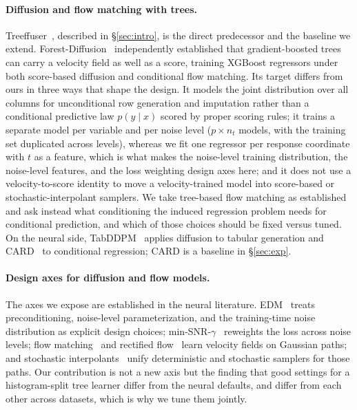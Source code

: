 \documentclass{article}
\begin{document}
\paragraph{Diffusion and flow matching with trees.} Treeffuser~\citep{treeffuser}, described in \S\ref{sec:intro}, is the direct predecessor and the baseline we extend. Forest-Diffusion~\citep{jolicoeurmartineau2024forest} independently established that gradient-boosted trees can carry a velocity field as well as a score, training XGBoost regressors under both score-based diffusion and conditional flow matching. Its target differs from ours in three ways that shape the design. It models the joint distribution over all columns for unconditional row generation and imputation rather than a conditional predictive law $p(y \mid x)$ scored by proper scoring rules; it trains a separate model per variable and per noise level ($p \times n_t$ models, with the training set duplicated across levels), whereas we fit one regressor per response coordinate with $t$ as a feature, which is what makes the noise-level training distribution, the noise-level features, and the loss weighting design axes here; and it does not use a velocity-to-score identity to move a velocity-trained model into score-based or stochastic-interpolant samplers. We take tree-based flow matching as established and ask instead what conditioning the induced regression problem needs for conditional prediction, and which of those choices should be fixed versus tuned. On the neural side, TabDDPM~\citep{kotelnikov2023tabddpm} applies diffusion to tabular generation and CARD~\citep{han2022card} to conditional regression; CARD is a baseline in \S\ref{sec:exp}.

\paragraph{Design axes for diffusion and flow models.} The axes we expose are established in the neural literature. EDM~\citep{karras2022edm} treats preconditioning, noise-level parameterization, and the training-time noise distribution as explicit design choices; min-SNR-$\gamma$~\citep{hang2023minsnr} reweights the loss across noise levels; flow matching~\citep{lipman2023flow} and rectified flow~\citep{liu2023rectified} learn velocity fields on Gaussian paths; and stochastic interpolants~\citep{albergo2023stochastic} unify deterministic and stochastic samplers for those paths. Our contribution is not a new axis but the finding that good settings for a histogram-split tree learner differ from the neural defaults, and differ from each other across datasets, which is why we tune them jointly.
\end{document}
